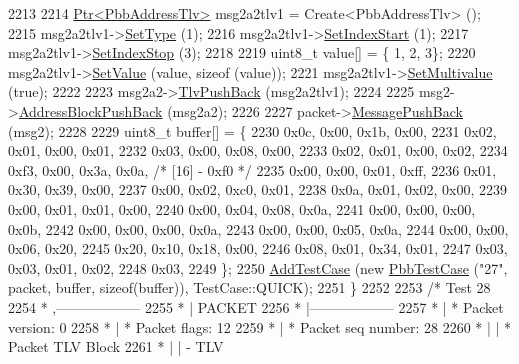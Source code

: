 \begin{DoxyCode}
2213 
2214     \hyperlink{classns3_1_1Ptr}{Ptr<PbbAddressTlv>} msg2a2tlv1 = Create<PbbAddressTlv> ();
2215     msg2a2tlv1->\hyperlink{classns3_1_1PbbTlv_a90a0452018ed364ac37c3ad116dd718b}{SetType} (1);
2216     msg2a2tlv1->\hyperlink{classns3_1_1PbbAddressTlv_a82d685ae4e4e2f6d2532cb212f5b2797}{SetIndexStart} (1);
2217     msg2a2tlv1->\hyperlink{classns3_1_1PbbAddressTlv_af37ebd0d99b8b894fee7cca449d7adb9}{SetIndexStop} (3);
2218 
2219     uint8\_t value[] = \{ 1, 2, 3\};
2220     msg2a2tlv1->\hyperlink{classns3_1_1PbbTlv_a1ca7d32f9b68990225f3267c2cc09f11}{SetValue} (value, \textcolor{keyword}{sizeof} (value));
2221     msg2a2tlv1->\hyperlink{classns3_1_1PbbAddressTlv_a305d359c769545937dc5f1fb20d74d1a}{SetMultivalue} (\textcolor{keyword}{true});
2222 
2223     msg2a2->\hyperlink{classns3_1_1PbbAddressBlock_a6e33cd1452dd3ff753de3e3c99e473a5}{TlvPushBack} (msg2a2tlv1);
2224 
2225     msg2->\hyperlink{classns3_1_1PbbMessage_a5f623bad2fb1adde7da885e1c92d5311}{AddressBlockPushBack} (msg2a2);
2226 
2227     packet->\hyperlink{classns3_1_1PbbPacket_a4a3170001ef758d9c9c4375b8f089826}{MessagePushBack} (msg2);
2228 
2229     uint8\_t buffer[] = \{
2230       0x0c, 0x00, 0x1b, 0x00,
2231       0x02, 0x01, 0x00, 0x01,
2232       0x03, 0x00, 0x08, 0x00,
2233       0x02, 0x01, 0x00, 0x02,
2234       0xf3, 0x00, 0x3a, 0x0a,   \textcolor{comment}{/* [16] - 0xf0 */}
2235       0x00, 0x00, 0x01, 0xff,
2236       0x01, 0x30, 0x39, 0x00,
2237       0x00, 0x02, 0xc0, 0x01,
2238       0x0a, 0x01, 0x02, 0x00,
2239       0x00, 0x01, 0x01, 0x00,
2240       0x00, 0x04, 0x08, 0x0a,
2241       0x00, 0x00, 0x00, 0x0b,
2242       0x00, 0x00, 0x00, 0x0a,
2243       0x00, 0x00, 0x05, 0x0a,
2244       0x00, 0x00, 0x06, 0x20,
2245       0x20, 0x10, 0x18, 0x00,
2246       0x08, 0x01, 0x34, 0x01,
2247       0x03, 0x03, 0x01, 0x02,
2248       0x03,
2249     \};
2250     \hyperlink{classns3_1_1TestCase_a3718088e3eefd5d6454569d2e0ddd835}{AddTestCase} (\textcolor{keyword}{new} \hyperlink{classPbbTestCase}{PbbTestCase} (\textcolor{stringliteral}{"27"}, packet, buffer, \textcolor{keyword}{sizeof}(buffer)), 
      TestCase::QUICK);
2251   \}
2252 
2253   \textcolor{comment}{/* Test 28}
2254 \textcolor{comment}{         * ,------------------}
2255 \textcolor{comment}{         * |  PACKET}
2256 \textcolor{comment}{         * |------------------}
2257 \textcolor{comment}{         * | * Packet version:    0}
2258 \textcolor{comment}{         * | * Packet flags:  12}
2259 \textcolor{comment}{         * | * Packet seq number: 28}
2260 \textcolor{comment}{         * |    | * Packet TLV Block}
2261 \textcolor{comment}{         * |    |     - TLV}

\end{DoxyCode}
